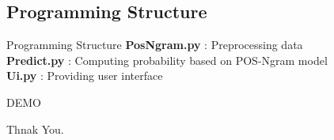 \documentclass{beamer}
\begin{document}
\subsection{Programming Structure}

\begin{frame}{Programming Structure}
    \textbf{PosNgram.py} : Preprocessing data\\
    \textbf{Predict.py} : Computing probability based on POS-Ngram model\\
    \textbf{Ui.py} : Providing user interface
\end{frame}

\begin{frame}
    \centering
    \Huge DEMO
\end{frame}

\begin{frame}
    \centering
    \Huge Thnak You.
\end{frame}

\end{document}
